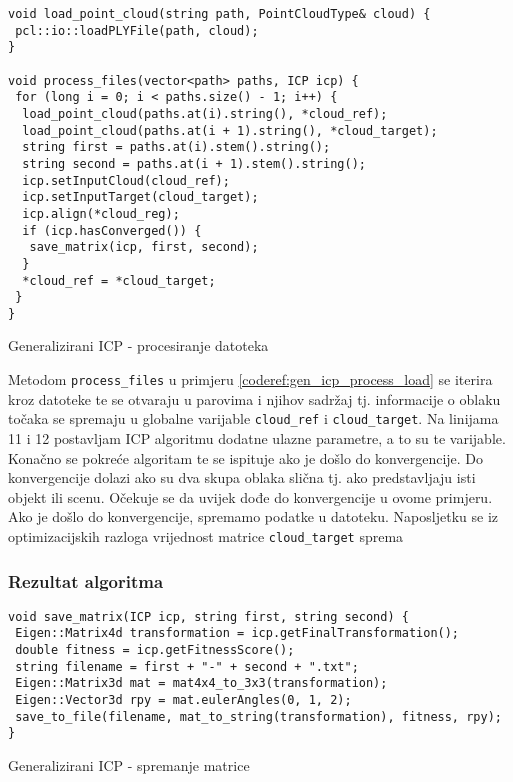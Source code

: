 \begin{listing}[h!]
  \begin{verbatim}
void load_point_cloud(string path, PointCloudType& cloud) {
 pcl::io::loadPLYFile(path, cloud);
}

void process_files(vector<path> paths, ICP icp) {
 for (long i = 0; i < paths.size() - 1; i++) {
  load_point_cloud(paths.at(i).string(), *cloud_ref);
  load_point_cloud(paths.at(i + 1).string(), *cloud_target);
  string first = paths.at(i).stem().string();
  string second = paths.at(i + 1).stem().string();
  icp.setInputCloud(cloud_ref);
  icp.setInputTarget(cloud_target);
  icp.align(*cloud_reg);
  if (icp.hasConverged()) {
   save_matrix(icp, first, second);
  }
  *cloud_ref = *cloud_target;
 }
}
  \end{verbatim}
  \caption{Generalizirani ICP - procesiranje datoteka}
  \label{coderef:gen_icp_process_load}
\end{listing}

Metodom \texttt{process_files} u primjeru \ref{coderef:gen_icp_process_load} se iterira kroz datoteke te se otvaraju u parovima i njihov sadržaj tj. informacije o oblaku točaka se spremaju u globalne varijable \texttt{cloud_ref} i \texttt{cloud_target}. Na linijama 11 i 12 postavljam ICP algoritmu dodatne ulazne parametre, a to su te varijable. Konačno se pokreće algoritam te se ispituje ako je došlo do konvergencije. Do konvergencije dolazi ako su dva skupa oblaka slična tj. ako predstavljaju isti objekt ili scenu. Očekuje se da uvijek dođe do konvergencije u ovome primjeru. Ako je došlo do konvergencije, spremamo podatke u datoteku. Naposljetku se iz optimizacijskih razloga vrijednost matrice \texttt{cloud_target} sprema

\subsubsection{Rezultat algoritma}
\begin{listing}[h!]
  \begin{verbatim}
void save_matrix(ICP icp, string first, string second) {
 Eigen::Matrix4d transformation = icp.getFinalTransformation();
 double fitness = icp.getFitnessScore();
 string filename = first + "-" + second + ".txt";
 Eigen::Matrix3d mat = mat4x4_to_3x3(transformation);
 Eigen::Vector3d rpy = mat.eulerAngles(0, 1, 2);
 save_to_file(filename, mat_to_string(transformation), fitness, rpy);
}
  \end{verbatim}
  \caption{Generalizirani ICP - spremanje matrice}
  \label{coderef:gen_icp_save_matrix}
\end{listing}

